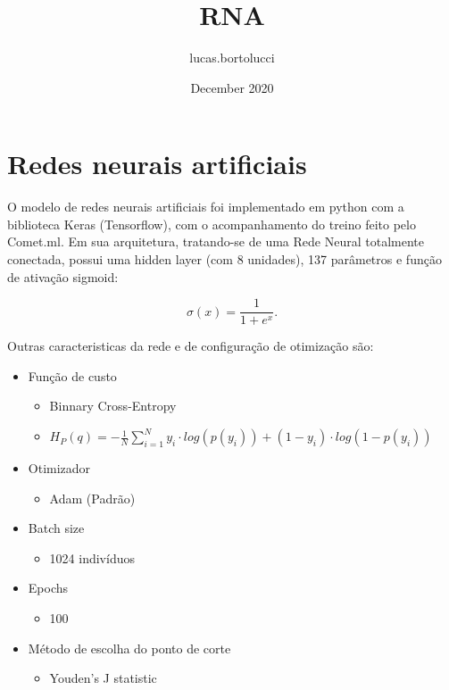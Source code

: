 \documentclass{article}
\title{RNA}
\author{lucas.bortolucci }
\date{December 2020}
\begin{document}
\maketitle

\section{Redes neurais artificiais}

O modelo de redes neurais artificiais foi implementado em python com a biblioteca Keras (Tensorflow), com o acompanhamento do treino feito pelo Comet.ml. Em sua arquitetura, tratando-se de uma Rede Neural totalmente conectada, possui uma hidden layer (com 8 unidades), 137 parâmetros e função de ativação sigmoid:

\begin{equation}
\sigma(x) = \frac{1}{1 + e^x}.
\end{equation}

Outras caracteristicas da rede e de configuração de otimização são:

\begin{itemize}
	\item  Função de custo
       	\begin{itemize}
     		\item  Binnary Cross-Entropy
     		\item $H_P(q) = - \frac{1}{N} \displaystyle\sum_{i=1}^{N} y_i \cdot log(p(y_i)) + (1 - y_i) \cdot log(1 - p(y_i))$
       		\end{itemize}
	\item  Otimizador
       	\begin{itemize}
     		\item Adam (Padrão)
       		\end{itemize}
	\item  Batch size
       	\begin{itemize}
     		\item  1024 indivíduos
       		\end{itemize}
	\item  Epochs
       	\begin{itemize}
     		\item  100
       		\end{itemize}
    \item  Método de escolha do ponto de corte
       	\begin{itemize}
     		\item  Youden's J statistic
       		\end{itemize}
\end{itemize}
\end{document}
